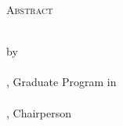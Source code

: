 \clearpage
\centering
\vspace*{-\toptafiddle}

\textsc{Abstract}

\thetitle{} \\
by \\
\theauthor{} \\

\thedegree, Graduate Program in \thefield{} \\
\theuniversity{} \\
\thechair{}, Chairperson \\
\thedate{}

\justify{}

\enlargethispage{\bottafiddle}
\clearpage
